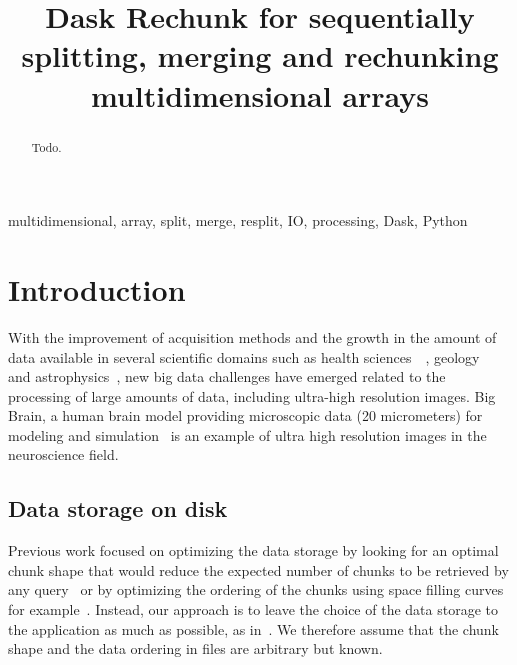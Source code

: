 \documentclass[conference]{IEEEtran}
\begin{document}
\title{ Dask Rechunk for sequentially splitting, merging and rechunking multidimensional arrays }

\author{
}

\maketitle

\begin{abstract}
Todo.
\end{abstract}

\begin{IEEEkeywords}
multidimensional, array, split, merge, resplit, IO, processing, Dask, Python
\end{IEEEkeywords}

\section{Introduction}
With the improvement of acquisition methods and the growth in the amount of data
available in several scientific domains such as health
sciences~\cite{bigdata_health}~\cite{Amunts1472}, geology~\cite{big_data_geology}
and astrophysics~\cite{biguniverse}, new big data challenges have emerged related
to the processing of large amounts of data, including ultra-high resolution
images. Big Brain, a human brain model providing microscopic data (20 micrometers) for
modeling and simulation~\cite{Amunts1472} is an example of ultra high resolution
images in the neuroscience field.

\subsection{Data storage on disk}
Previous work focused on optimizing the data storage by looking for an optimal
chunk shape that would reduce the expected number of chunks to be retrieved by
any query~\cite{optimal_chuking} or by optimizing the ordering of the chunks
using space filling curves for example~\cite{optimal_chuking, openconnectomecluster}.
Instead, our approach is to leave the choice of the
data storage to the application as much as possible, as in~\cite{seqalgorithms}. We therefore assume that
the chunk shape and the data ordering in files are arbitrary but known.
\end{document}

